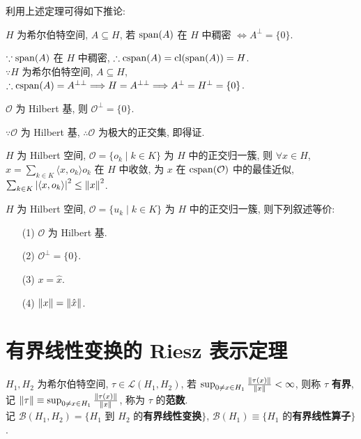 \documentclass{note}
\begin{document}
利用上述定理可得如下推论:
\begin{thm}[(课本定理 13.14)]
    $H$ 为希尔伯特空间, $A\subseteq H$, 若 $\operatorname{span}(A)$ 在 $H$ 中稠密 $\Longleftrightarrow A^{\perp}=\{0\}$.
\end{thm}
\begin{pf}
    $\because\operatorname{span}(A)$ 在 $H$ 中稠密, $\therefore\operatorname{cspan}(A)=\operatorname{cl}(\operatorname{span}(A))=H$.\\
    $\because H$ 为希尔伯特空间, $A\subseteq H$, $\therefore\operatorname{cspan}(A)=A^{\perp\perp}\Longrightarrow H=A^{\perp\perp}\Longrightarrow A^{\perp}=H^{\perp}=\{0\}$.\\
\end{pf}

\begin{thm}[(课本定理 13.15)]
    $\mathcal{O}$ 为 Hilbert 基, 则 $\mathcal{O}^{\perp}=\{0\}$.
\end{thm}
\begin{pf}
    $\because\mathcal{O}$ 为 Hilbert 基, $\therefore\mathcal{O}$ 为极大的正交集, 即得证.
\end{pf}

\begin{thm}[(课本定理 13.25)]
    $H$ 为 Hilbert 空间, $\mathcal{O}=\{o_k\mid k\in K\}$ 为 $H$ 中的正交归一簇, 则 $\forall x\in H$, $\hat{x}=\sum_{k\in K}\langle x,o_k\rangle o_k$ 在 $H$ 中收敛, 为 $x$ 在 $\operatorname{cspan}(\mathcal{O})$ 中的最佳近似, $\sum_{k\in K}\left\lvert\langle x,o_k\rangle\right\rvert^2\leq\left\lVert x\right\rVert^2$.
\end{thm}

\begin{thm}[(课本定理 13.26)]
    $H$ 为 Hilbert 空间, $\mathcal{O}=\{u_k\mid k\in K\}$ 为 $H$ 中的正交归一簇, 则下列叙述等价:
    \begin{itemize}
        \item[(1)] $\mathcal{O}$ 为 Hilbert 基.
        \item[(2)] $\mathcal{O}^{\perp}=\{0\}$.
        \item[(3)] $x=\hat{x}$.
        \item[(4)] $\left\lVert x\right\rVert=\left\lVert\hat{x}\right\rVert$.
    \end{itemize}
\end{thm}

\section{有界线性变换的 Riesz 表示定理}
\begin{df}[有界线性变换]
    $H_1,H_2$ 为希尔伯特空间, $\tau\in\mathcal{L}(H_1,H_2)$, 若 $\sup_{0\neq x\in H_1}\frac{\left\lVert\tau(x)\right\rVert}{\left\lVert x\right\rVert}<\infty$, 则称 $\tau$ \textbf{有界}, 记 $\left\lVert\tau\right\rVert\equiv\sup_{0\neq x\in H_1}\frac{\left\lVert\tau(x)\right\rVert}{\left\lVert x\right\rVert}$, 称为 $\tau$ 的\textbf{范数}.\\
    记 $\mathcal{B}(H_1,H_2)=\{H_1$ 到 $H_2$ 的\textbf{有界线性变换}$\}$, $\mathcal{B}(H_1)\equiv\{H_1$ 的\textbf{有界线性算子}$\}$.
\end{df}
\end{document}
